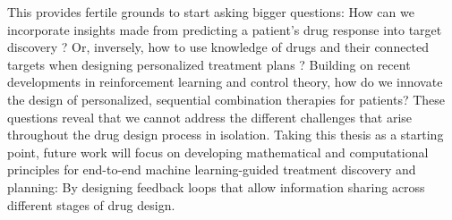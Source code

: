This provides fertile grounds to start asking bigger questions: How can we incorporate insights made from predicting a patient's drug response into target discovery \citep{huang2022artificial}? Or, inversely, how to use knowledge of drugs and their connected targets when designing personalized treatment plans \citep{nilforoshan2023zero}? Building on recent developments in reinforcement learning and control theory, how do we innovate the design of personalized, sequential combination therapies for patients?
These questions reveal that we cannot address the different challenges that arise throughout the drug design process in isolation.
Taking this thesis as a starting point, future work will focus on developing mathematical and computational principles for end-to-end machine learning-guided treatment discovery and planning:
By designing feedback loops that allow information sharing across different stages of drug design.


